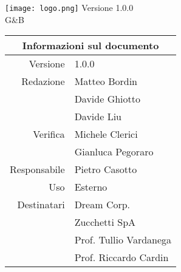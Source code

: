 \maketitle
	\begin{center}
	\hspace{5em}
	   \texttt{[image: logo.png]}\newline
	\huge Versione 1.0.0 
	\\G\&B
	
	\begin{table}[h!]
		\centering
		\begin{tabular}{r|l}
			\multicolumn{2}{c}{Informazioni sul documento}\\
			\hline
			Versione & 1.0.0 \\
			Redazione & Matteo Bordin\\
			& Davide Ghiotto\\
			& Davide Liu\\
			Verifica & Michele Clerici\\
			& Gianluca Pegoraro\\
			Responsabile & Pietro Casotto\\
			Uso & Esterno\\
			Destinatari & Dream Corp. \\
			& Zucchetti SpA\\
			& Prof. Tullio Vardanega\\
			& Prof. Riccardo Cardin\\
		\end{tabular}
	\end{table}
	\end{center}
	\newpage
	
	\newpage
	\tableofcontents
	\newpage
	\listoftables
	\newpage
	\listoffigures
	\newpage

